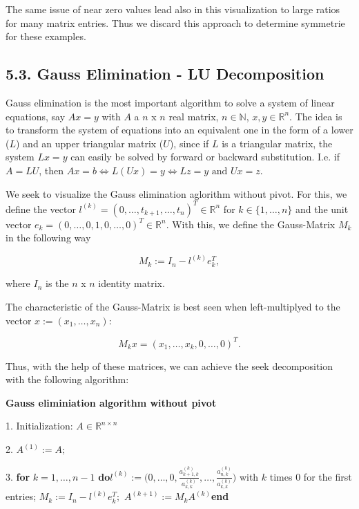 \documentclass[11pt]{article}
\begin{document}
    The same issue of near zero values lead also in this visualization to
large ratios for many matrix entries. Thus we discard this approach to
determine symmetrie for these examples.

    \subsection{5.3. Gauss Elimination - LU
Decomposition}\label{gauss-elimination---lu-decomposition}

    Gauss elimination is the most important algorithm to solve a system of
linear equations, say \(Ax=y\) with \(A\) a \(n\) x \(n\) real matrix,
\(n \in \mathbb{N}\), \(x,y \in \mathbb{R}^n\). The idea is to transform
the system of equations into an equivalent one in the form of a lower
(\(L\)) and an upper triangular matrix (\(U\)), since if \(L\) is a
triangular matrix, the system \(Lx = y\) can easily be solved by forward
or backward substitution. I.e. if \(A = LU\), then
\(Ax=b \Longleftrightarrow L(Ux)=y \Longleftrightarrow Lz=y \text{ and } Ux=z\).

We seek to visualize the Gauss elimination aglorithm without pivot. For
this, we define the vector
\(l^{(k)} = (0,\dots,t_{k+1},\dots, t_n)^T \in \mathbb{R}^n\) for
\(k \in \{1, \dots, n\}\) and the unit vector
\(e_k = (0, \dots, 0, 1, 0, \dots, 0)^T \in \mathbb{R}^n\). With this,
we define the Gauss-Matrix \(M_k\) in the following way

\[M_k := I_n-l^{(k)}e_k^T,\]

where \(I_n\) is the \(n\) x \(n\) identity matrix.

The characteristic of the Gauss-Matrix is best seen when left-multiplyed
to the vector \(x:= (x_1, \dots, x_n)\):

\[M_kx = (x_1, \dots, x_k, 0, \dots, 0)^T.\]

Thus, with the help of these matrices, we can achieve the seek
decomposition with the following algorithm:

\textbf{Gauss eliminiation algorithm without pivot}

1. Initialization: \(A \in \mathbb{R}^{n \times n}\)

2. \(A^{(1)}:=A;\)

3. \textbf{for} \(k=1,\dots,n-1\)
\textbf{do}\(l^{(k)}:= \Bigg(0, \dots, 0, \frac{a_{k+1,k}^{(k)}}{a_{k,k}^{(k)}}, \dots, \frac{a_{n,k}^{(k)}}{a_{k,k}^{(k)}} \Bigg)\)
with \(k\) times \(0\) for the first entries;
\(M_k := I_n-l^{(k)}e_k^T;\) \(A^{(k+1)}:= M_kA^{(k)}\)\textbf{end}
\end{document}
